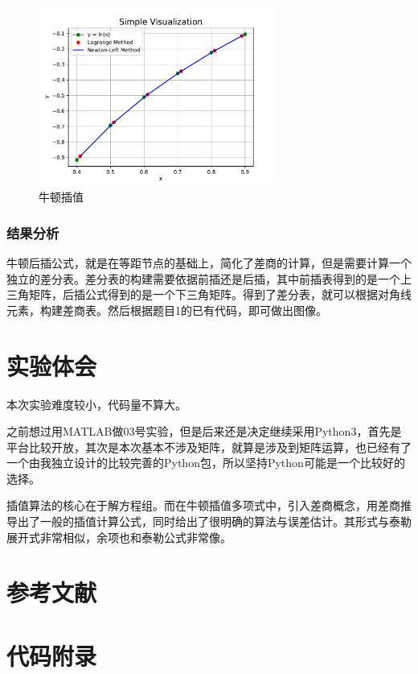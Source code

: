 \begin{figure}[H]
    \centering
    \includegraphics[width=0.7\textwidth]{../../img/06/newton.pdf}
    \caption{牛顿插值}
    \label{Fig:newton}
\end{figure}

\subsubsection{结果分析}
牛顿后插公式，就是在等距节点的基础上，简化了差商的计算，但是需要计算一个独立的差分表。差分表的构建需要依据前插还是后插，其中前插表得到的是一个上三角矩阵，后插公式得到的是一个下三角矩阵。得到了差分表，就可以根据对角线元素，构建差商表。然后根据题目1的已有代码，即可做出图像。

\section{实验体会}

本次实验难度较小，代码量不算大。

之前想过用MATLAB做03号实验，但是后来还是决定继续采用Python3，首先是平台比较开放，其次是本次基本不涉及矩阵，就算是涉及到矩阵运算，也已经有了一个由我独立设计的比较完善的Python包，所以坚持Python可能是一个比较好的选择。

插值算法的核心在于解方程组。而在牛顿插值多项式中，引入差商概念，用差商推导出了一般的插值计算公式，同时给出了很明确的算法与误差估计。其形式与泰勒展开式非常相似，余项也和泰勒公式非常像。

\section{参考文献}

\printbibliography[heading=none]


\section{代码附录}
\label{附录}

